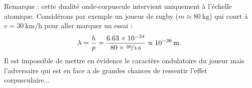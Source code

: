 Remarque : cette dualité onde-corpuscule intervient uniquement à l'échelle atomique. Considérons par exemple un joueur de rugby (\(m\approx\SI{80}{\kilo\gram}\)) qui court à \(v=\SI{30}{\kilo\meter\per\hour}\) pour aller marquer un essai : \[\lambda=\dfrac{h}{p}=\dfrac{\num{6.63e-34}}{\num{80}\times\nicefrac{\num{30}}{\num{3.6}}}\propto\SI{e-36}{\meter}.\] Il est impossible de mettre en évidence le caractère ondulatoire du joueur mais l'adversaire qui est en face a de grandes chances de ressentir l'effet corpusculaire...